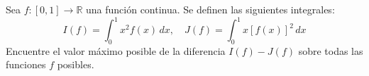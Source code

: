 \begin{prob} Sea $f: [0, 1] \to \mathbb{R}$ una función continua. Se definen las siguientes integrales:
\[
I(f) = \int_{0}^{1} x^2 f(x) \, dx, \quad J(f) = \int_{0}^{1} x [f(x)]^2 \, dx
\]
Encuentre el valor máximo posible de la diferencia $I(f) - J(f)$ sobre todas las funciones $f$ posibles.
\end{prob}




